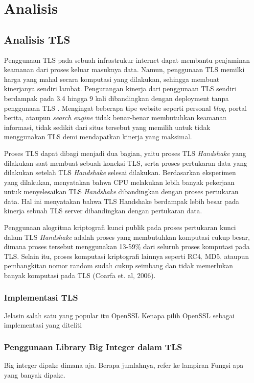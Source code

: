 \chapter{Analisis}

\section{Analisis TLS}
Penggunaan TLS pada sebuah infrastrukur internet dapat membantu penjaminan keamanan dari proses keluar masuknya data. Namun, penggunaan TLS memilki harga yang mahal secara komputasi yang dilakukan, sehingga membuat kinerjanya sendiri lambat. Pengurangan kinerja dari penggunaan TLS sendiri berdampak pada 3.4 hingga 9 kali dibandingkan dengan deployment tanpa penggunaan TLS \citep{perf_tls}. Mengingat beberapa tipe website seperti personal \textit{blog}, portal berita, ataupun \textit{search engine }tidak benar-benar membutuhkan keamanan informasi, tidak sedikit dari situs tersebut yang memilih untuk tidak menggunakan TLS demi mendapatkan kinerja yang maksimal.

Proses TLS dapat dibagi menjadi dua bagian, yaitu proses TLS \textit{Handshake} yang dilakukan saat membuat sebuah koneksi TLS, serta proses pertukaran data yang dilakukan setelah TLS \textit{Handshake} selesai dilakukan. Berdasarkan eksperimen yang dilakukan, \cite{perf_tls} menyatakan bahwa CPU melakukan lebih banyak pekerjaan untuk menyelesaikan TLS \textit{Handshake} dibandingkan dengan proses pertukaran data. Hal ini menyatakan bahwa TLS Handshake berdampak lebih besar pada kinerja sebuah TLS server dibandingkan dengan pertukaran data.

Penggunaan alogritma kriptografi kunci publik pada proses pertukaran kunci  dalam TLS \textit{Handshake} adalah proses yang membutuhkan komputasi cukup besar, dimana proses tersebut menggunakan 13-59\% dari seluruh proses komputasi pada TLS. Selain itu, proses komputasi kriptografi lainnya seperti RC4, MD5, ataupun pembangkitan nomor random sudah cukup seimbang dan tidak memerlukan banyak komputasi pada TLS (Coarfa et. al, 2006).

\subsection{Implementasi TLS}
Jelasin salah satu yang popular itu OpenSSL
Kenapa pilih OpenSSL sebagai implementasi yang diteliti
%

\subsection{Penggunaan Library Big Integer dalam TLS}
Big integer dipake dimana aja.
Berapa jumlahnya, refer ke lampiran
Fungsi apa yang banyak dipake.


